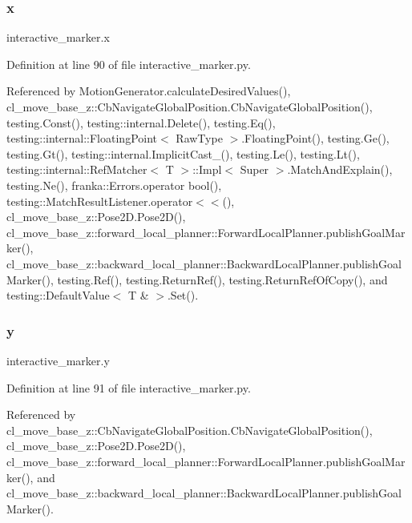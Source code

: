 \subsubsection{\texorpdfstring{x}{x}}
{\footnotesize\ttfamily interactive\+\_\+marker.\+x}



Definition at line 90 of file interactive\+\_\+marker.\+py.



Referenced by Motion\+Generator.\+calculate\+Desired\+Values(), cl\+\_\+move\+\_\+base\+\_\+z\+::\+Cb\+Navigate\+Global\+Position.\+Cb\+Navigate\+Global\+Position(), testing.\+Const(), testing\+::internal.\+Delete(), testing.\+Eq(), testing\+::internal\+::\+Floating\+Point$<$ Raw\+Type $>$.\+Floating\+Point(), testing.\+Ge(), testing.\+Gt(), testing\+::internal.\+Implicit\+Cast\+\_\+(), testing.\+Le(), testing.\+Lt(), testing\+::internal\+::\+Ref\+Matcher$<$ T $>$\+::\+Impl$<$ Super $>$.\+Match\+And\+Explain(), testing.\+Ne(), franka\+::\+Errors.\+operator bool(), testing\+::\+Match\+Result\+Listener.\+operator$<$$<$(), cl\+\_\+move\+\_\+base\+\_\+z\+::\+Pose2\+D.\+Pose2\+D(), cl\+\_\+move\+\_\+base\+\_\+z\+::forward\+\_\+local\+\_\+planner\+::\+Forward\+Local\+Planner.\+publish\+Goal\+Marker(), cl\+\_\+move\+\_\+base\+\_\+z\+::backward\+\_\+local\+\_\+planner\+::\+Backward\+Local\+Planner.\+publish\+Goal\+Marker(), testing.\+Ref(), testing.\+Return\+Ref(), testing.\+Return\+Ref\+Of\+Copy(), and testing\+::\+Default\+Value$<$ T \& $>$.\+Set().

\mbox{\label{namespaceinteractive__marker_a5e45ec67a60dd2f10e5b53a9274e4730}} 
\subsubsection{\texorpdfstring{y}{y}}
{\footnotesize\ttfamily interactive\+\_\+marker.\+y}



Definition at line 91 of file interactive\+\_\+marker.\+py.



Referenced by cl\+\_\+move\+\_\+base\+\_\+z\+::\+Cb\+Navigate\+Global\+Position.\+Cb\+Navigate\+Global\+Position(), cl\+\_\+move\+\_\+base\+\_\+z\+::\+Pose2\+D.\+Pose2\+D(), cl\+\_\+move\+\_\+base\+\_\+z\+::forward\+\_\+local\+\_\+planner\+::\+Forward\+Local\+Planner.\+publish\+Goal\+Marker(), and cl\+\_\+move\+\_\+base\+\_\+z\+::backward\+\_\+local\+\_\+planner\+::\+Backward\+Local\+Planner.\+publish\+Goal\+Marker().


